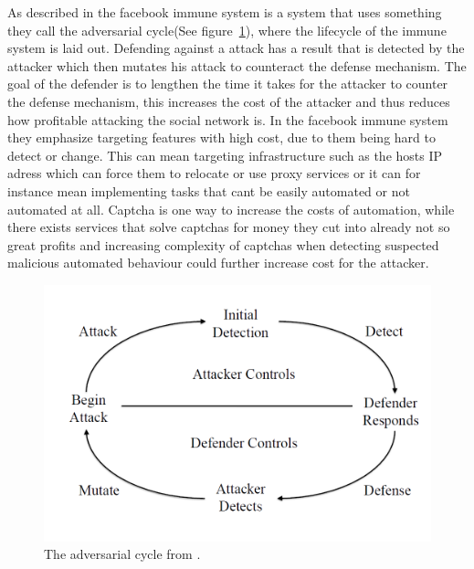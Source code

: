 As described in \cite{jan-fis} the facebook immune system is a system that uses something they call the adversarial cycle(See figure~\ref{jan-adv-cycle-fis}), where the lifecycle of the immune system is laid out.
Defending against a attack has a result that is detected by the attacker which then mutates his attack to counteract the defense mechanism. The goal of the defender is to lengthen the time it takes for the attacker to counter the defense mechanism, this increases the cost of the attacker and thus reduces how profitable attacking the social network is. In the facebook immune system they emphasize targeting features with high cost, due to them being hard to detect or change. This can mean targeting infrastructure such as the hosts IP adress which can force them to relocate or use proxy services or it can for instance mean implementing tasks that cant be easily automated or not automated at all. Captcha \cite{jan-captcha} is one way to increase the costs of automation, while there exists services that solve captchas for money they cut into already not so great profits \cite{jan-boshmaf} and increasing complexity of captchas when detecting suspected malicious automated behaviour could further increase cost for the attacker.


\begin{figure}
	\centering
	\includegraphics[scale=0.4]{fig/fis-adv-cycle}
	\caption{The adversarial cycle from \cite{jan-fis}.}
	\label{jan-adv-cycle-fis}
\end{figure}

